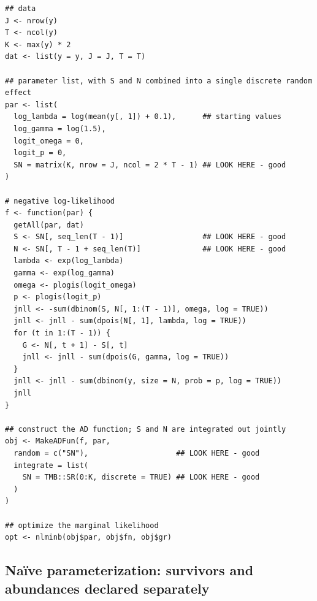 \documentclass[11pt]{article}
\begin{document}
\begin{verbatim}
## data
J <- nrow(y)
T <- ncol(y)
K <- max(y) * 2
dat <- list(y = y, J = J, T = T)

## parameter list, with S and N combined into a single discrete random effect
par <- list(
  log_lambda = log(mean(y[, 1]) + 0.1),      ## starting values
  log_gamma = log(1.5),
  logit_omega = 0,
  logit_p = 0,
  SN = matrix(K, nrow = J, ncol = 2 * T - 1) ## LOOK HERE - good
)

# negative log-likelihood
f <- function(par) {
  getAll(par, dat)                           
  S <- SN[, seq_len(T - 1)]                  ## LOOK HERE - good
  N <- SN[, T - 1 + seq_len(T)]              ## LOOK HERE - good
  lambda <- exp(log_lambda)
  gamma <- exp(log_gamma)
  omega <- plogis(logit_omega)
  p <- plogis(logit_p)
  jnll <- -sum(dbinom(S, N[, 1:(T - 1)], omega, log = TRUE))
  jnll <- jnll - sum(dpois(N[, 1], lambda, log = TRUE))
  for (t in 1:(T - 1)) {
    G <- N[, t + 1] - S[, t]
    jnll <- jnll - sum(dpois(G, gamma, log = TRUE))
  }
  jnll <- jnll - sum(dbinom(y, size = N, prob = p, log = TRUE))
  jnll
}

## construct the AD function; S and N are integrated out jointly
obj <- MakeADFun(f, par,
  random = c("SN"),                    ## LOOK HERE - good
  integrate = list(
    SN = TMB::SR(0:K, discrete = TRUE) ## LOOK HERE - good 
  )
)

## optimize the marginal likelihood
opt <- nlminb(obj$par, obj$fn, obj$gr)
\end{verbatim}

\subsection{ Na\"{i}ve parameterization: survivors and abundances declared separately}
\end{document}
